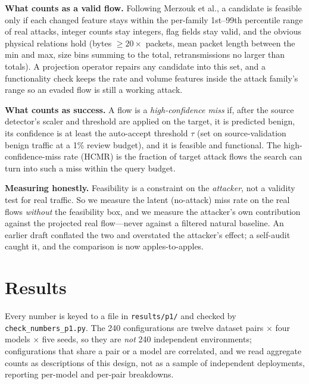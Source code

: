 \documentclass[11pt]{article}
\begin{document}
\textbf{What counts as a valid flow.} Following Merzouk et al., a candidate is feasible only if each changed feature stays within the per-family 1st--99th percentile range of real attacks, integer counts stay integers, flag fields stay valid, and the obvious physical relations hold (bytes $\ge 20 \times$ packets, mean packet length between the min and max, size bins summing to the total, retransmissions no larger than totals). A projection operator repairs any candidate into this set, and a functionality check keeps the rate and volume features inside the attack family's range so an evaded flow is still a working attack.

\textbf{What counts as success.} A flow is a \emph{high-confidence miss} if, after the source detector's scaler and threshold are applied on the target, it is predicted benign, its confidence is at least the auto-accept threshold $\tau$ (set on source-validation benign traffic at a 1\% review budget), and it is feasible and functional. The high-confidence-miss rate (HCMR) is the fraction of target attack flows the search can turn into such a miss within the query budget.

\textbf{Measuring honestly.} Feasibility is a constraint on the \emph{attacker}, not a validity test for real traffic. So we measure the latent (no-attack) miss rate on the real flows \emph{without} the feasibility box, and we measure the attacker's own contribution against the projected real flow---never against a filtered natural baseline. An earlier draft conflated the two and overstated the attacker's effect; a self-audit caught it, and the comparison is now apples-to-apples.

\section{Results}
Every number is keyed to a file in \texttt{results/p1/} and checked by \texttt{check\_numbers\_p1.py}. The 240 configurations are twelve dataset pairs $\times$ four models $\times$ five seeds, so they are \emph{not} 240 independent environments; configurations that share a pair or a model are correlated, and we read aggregate counts as descriptions of this design, not as a sample of independent deployments, reporting per-model and per-pair breakdowns.
\end{document}
